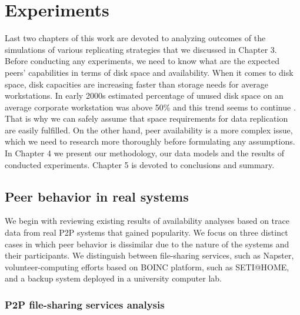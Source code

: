 \documentclass{pracamgren}
\begin{document}
%
%
%
%

\chapter{Experiments}\label{chap:experiments}

Last two chapters of this work are devoted to analyzing outcomes of the simulations of various replicating strategies that we discussed in Chapter 3.
Before conducting any experiments, we need to know what are the expected peers' capabilities in terms of disk space and availability. When it comes to disk space, disk capacities are increasing faster than storage needs for average workstations. In early 2000s estimated percentage of unused disk space on an average corporate workstation was above 50\% \cite{farsite} and this trend seems to continue \cite{hetero}. That is why we can safely assume that space requirements for data replication are easily fulfilled. On the other hand, peer availability is a more complex issue, which we need to research more thoroughly before formulating any assumptions.\\

In Chapter 4 we present our methodology, our data models and the results of conducted experiments. Chapter 5 is devoted to conclusions and summary.\\

\section{Peer behavior in real systems}

We begin with reviewing existing results of availability analyses based on trace data from real P2P systems that gained popularity. We focus on three distinct cases in which peer behavior is dissimilar due to the nature of the systems and their participants. We distinguish between file-sharing services, such as Napster, volunteer-computing efforts based on BOINC platform, such as SETI@HOME, and a backup system deployed in a university computer lab.\\

\subsection{P2P file-sharing services analysis}
\end{document}
